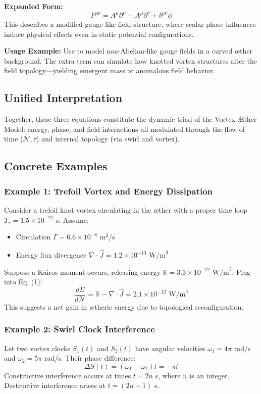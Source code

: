 \documentclass[12pt]{article}
\begin{document}
    \textbf{Expanded Form:}
\[
F^{\mu\nu} = A^\mu \partial^\mu - A^\mu \partial^\nu + \delta^{\mu\nu} \phi
\]
This describes a modified gauge-like field structure, where scalar phase influences induce physical effects even in static potential configurations.

\textbf{Usage Example:} Use to model non-Abelian-like gauge fields in a curved æther background. The extra term can simulate how knotted vortex structures alter the field topology—yielding emergent mass or anomalous field behavior.

\subsection*{Unified Interpretation}

Together, these three equations constitute the dynamic triad of the Vortex Æther Model: energy, phase, and field interactions all modulated through the flow of time (\(\mathcal{N}, \tau\)) and internal topology (via swirl and vortex).



    \subsection*{Concrete Examples}

\subsubsection*{Example 1: Trefoil Vortex and Energy Dissipation}
Consider a trefoil knot vortex circulating in the æther with a proper time loop $T_v = 1.5 \times 10^{-21}$ s. Assume:
\begin{itemize}
  \item Circulation $\Gamma = 6.6 \times 10^{-8} \text{ m}^2/\text{s}$
  \item Energy flux divergence $\nabla \cdot \vec{J} = 1.2 \times 10^{-13} \text{ W/m}^3$
\end{itemize}

Suppose a Kairos moment occurs, releasing energy $\mathbb{K} = 3.3 \times 10^{-12} \text{ W/m}^3$. Plug into Eq. (1):
\[
\frac{dE}{d\mathcal{N}} = \mathbb{K} - \nabla \cdot \vec{J} = 2.1 \times 10^{-12} \text{ W/m}^3
\]
This suggests a net gain in ætheric energy due to topological reconfiguration.

\subsubsection*{Example 2: Swirl Clock Interference}
Let two vortex clocks $S_1(t)$ and $S_2(t)$ have angular velocities $\omega_1 = 4\pi$ rad/s and $\omega_2 = 5\pi$ rad/s. Their phase difference:
\[
\Delta S(t) = (\omega_1 - \omega_2) t = -\pi t
\]
Constructive interference occurs at times $t = 2n$ s, where $n$ is an integer. Destructive interference arises at $t = (2n + 1)$ s.
\end{document}
